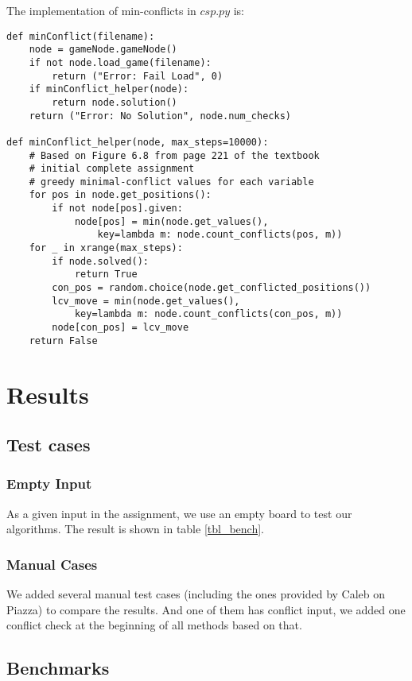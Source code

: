 \documentclass[11pt]{article}
\begin{document}
The implementation of min-conflicts in $csp.py$ is:

\lstset{language=Python}
\begin{lstlisting}[frame=single]
def minConflict(filename):
	node = gameNode.gameNode()
	if not node.load_game(filename):
		return ("Error: Fail Load", 0)
	if minConflict_helper(node):
		return node.solution()
	return ("Error: No Solution", node.num_checks)

def minConflict_helper(node, max_steps=10000):
	# Based on Figure 6.8 from page 221 of the textbook
	# initial complete assignment
	# greedy minimal-conflict values for each variable
	for pos in node.get_positions():
		if not node[pos].given:
			node[pos] = min(node.get_values(),
				key=lambda m: node.count_conflicts(pos, m))
	for _ in xrange(max_steps):
		if node.solved():
			return True
		con_pos = random.choice(node.get_conflicted_positions())
		lcv_move = min(node.get_values(),
			key=lambda m: node.count_conflicts(con_pos, m))
		node[con_pos] = lcv_move
	return False
\end{lstlisting}

\section{Results}

\subsection{Test cases}

\subsubsection{Empty Input}

As a given input in the assignment, we use an empty board to test our algorithms.
The result is shown in table \ref{tbl_bench}.

\subsubsection{Manual Cases}

We added several manual test cases (including the ones provided by Caleb on
Piazza) to compare the results. And one of them has conflict input, we added one conflict check at the beginning of all methods based on that.

\subsection{Benchmarks}
\end{document}
